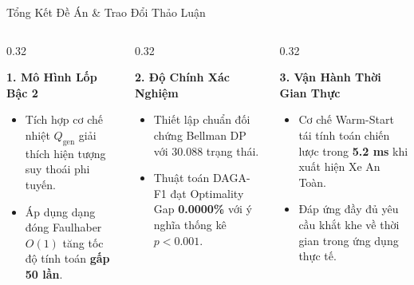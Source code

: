 \documentclass[aspectratio=169, 10pt]{beamer}
\begin{document}
\begin{frame}{Tổng Kết Đề Án \& Trao Đổi Thảo Luận}
  \begin{columns}[T]
    \begin{column}{0.32\textwidth}
      \begin{block}{\centering \textbf{1. Mô Hình Lốp Bậc 2}}
        \scriptsize
        \begin{itemize}
          \item Tích hợp cơ chế nhiệt $Q_{\text{gen}}$ giải thích hiện tượng suy thoái phi tuyến.
          \item Áp dụng dạng đóng Faulhaber $O(1)$ tăng tốc độ tính toán \textbf{gấp 50 lần}.
        \end{itemize}
      \end{block}
    \end{column}

    \begin{column}{0.32\textwidth}
      \begin{alertblock}{\centering \textbf{2. Độ Chính Xác Nghiệm}}
        \scriptsize
        \begin{itemize}
          \item Thiết lập chuẩn đối chứng Bellman DP với 30.088 trạng thái.
          \item Thuật toán DAGA-F1 đạt Optimality Gap \textbf{0.0000\%} với ý nghĩa thống kê $p < 0.001$.
        \end{itemize}
      \end{alertblock}
    \end{column}

    \begin{column}{0.32\textwidth}
      \begin{exampleblock}{\centering \textbf{3. Vận Hành Thời Gian Thực}}
        \scriptsize
        \begin{itemize}
          \item Cơ chế Warm-Start tái tính toán chiến lược trong \textbf{5.2 ms} khi xuất hiện Xe An Toàn.
          \item Đáp ứng đầy đủ yêu cầu khắt khe về thời gian trong ứng dụng thực tế.
        \end{itemize}
      \end{exampleblock}
    \end{column}
  \end{columns}


\end{frame}
\end{document}
